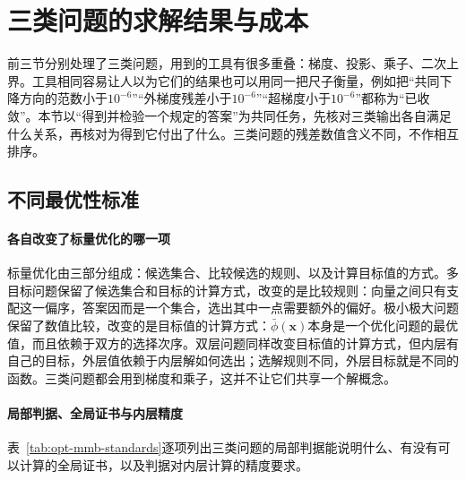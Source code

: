 \section{三类问题的求解结果与成本}
\label{sec:opt-mmb-results-costs}

前三节分别处理了三类问题，用到的工具有很多重叠：梯度、投影、乘子、二次上界。工具相同容易让人以为它们的结果也可以用同一把尺子衡量，例如把“共同下降方向的范数小于$10^{-6}$”“外梯度残差小于$10^{-6}$”“超梯度小于$10^{-6}$”都称为“已收敛”。本节以“得到并检验一个规定的答案”为共同任务，先核对三类输出各自满足什么关系，再核对为得到它付出了什么。三类问题的残差数值含义不同，不作相互排序。

\subsection{不同最优性标准}
\label{sec:opt-mmb-standards}

\paragraph{各自改变了标量优化的哪一项}
标量优化由三部分组成：候选集合、比较候选的规则、以及计算目标值的方式。多目标问题保留了候选集合和目标的计算方式，改变的是比较规则：向量之间只有支配这一偏序，答案因而是一个集合，选出其中一点需要额外的偏好。极小极大问题保留了数值比较，改变的是目标值的计算方式：$\bar\phi(\bm x)$本身是一个优化问题的最优值，而且依赖于双方的选择次序。双层问题同样改变目标值的计算方式，但内层有自己的目标，外层值依赖于内层解如何选出；选解规则不同，外层目标就是不同的函数。三类问题都会用到梯度和乘子，这并不让它们共享一个解概念。

\paragraph{局部判据、全局证书与内层精度}
表~\ref{tab:opt-mmb-standards}逐项列出三类问题的局部判据能说明什么、有没有可以计算的全局证书，以及判据对内层计算的精度要求。

